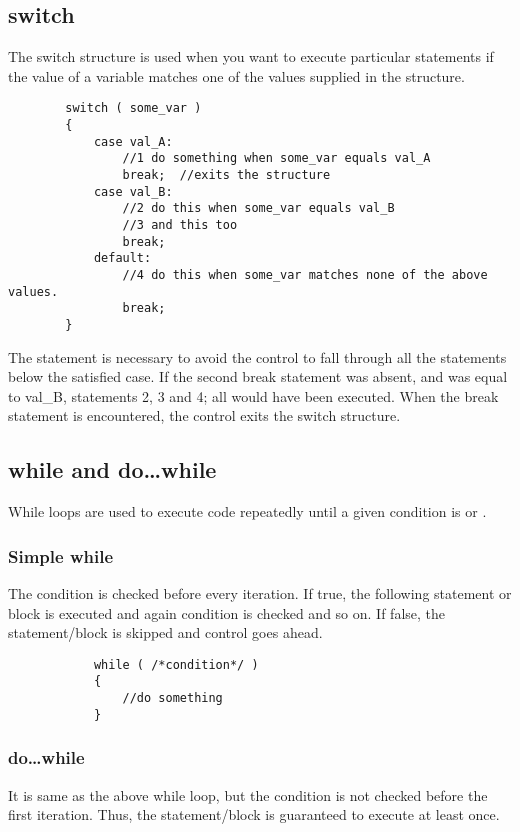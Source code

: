 \documentclass{article}
\begin{document}
	\subsection{switch}

		The switch structure is used when you want to execute particular statements if the value of a variable matches one of the values supplied in the structure.

		\begin{lstlisting}
		switch ( some_var )
		{
			case val_A:
				//1 do something when some_var equals val_A
				break;	//exits the structure
			case val_B:
				//2 do this when some_var equals val_B
				//3 and this too
				break;
			default:
				//4 do this when some_var matches none of the above values.
				break;
		}
		\end{lstlisting}

		The  statement is necessary to avoid the control to fall through all the statements below the satisfied case. If the second break statement was absent, and  was equal to val\_B, statements 2, 3 and 4; all would have been executed. When the break statement is encountered, the control exits the switch structure.

	\subsection{while and do\ldots while}

		While loops are used to execute code repeatedly until a given condition is  or .

		\subsubsection{Simple while}

			The condition is checked before every iteration. If true, the following statement or block is executed and again condition is checked and so on. If false, the statement/block is skipped and control goes ahead.

			\begin{lstlisting}
			while ( /*condition*/ )
			{
				//do something
			}
			\end{lstlisting}

		\subsubsection{do\ldots while}

			It is same as the above while loop, but the condition is not checked before the first iteration. Thus, the statement/block is guaranteed to execute at least once.
\end{document}
